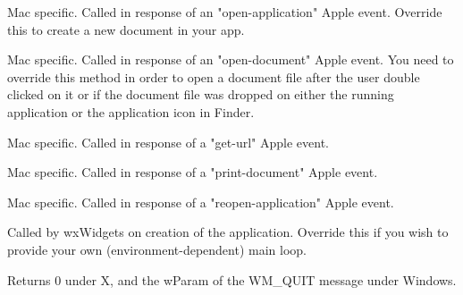 \label{wxappmacnewfile}


Mac specific. Called in response of an "open-application" Apple event.
Override this to create a new document in your app.

\label{wxappmacopenfile}


Mac specific. Called in response of an "open-document" Apple event. You need to 
override this method in order to open a document file after the
user double clicked on it or if the document file was dropped
on either the running application or the application icon in
Finder.

\label{wxappmacopenurl}


Mac specific. Called in response of a "get-url" Apple event.

\label{wxappmacprintfile}


Mac specific. Called in response of a "print-document" Apple event.


\label{wxappmacreopenapp}


Mac specific. Called in response of a "reopen-application" Apple event.

\label{wxappmainloop}


Called by wxWidgets on creation of the application. Override this if you wish
to provide your own (environment-dependent) main loop.


Returns 0 under X, and the wParam of the WM\_QUIT message under Windows.

